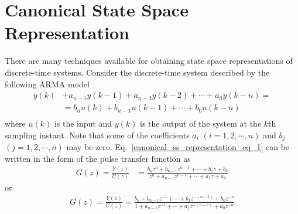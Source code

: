 \documentclass[11pt,a4paper,oneside]{book}
\numberwithin{equation}{section}
\theoremstyle{it}
\theoremstyle{definition}
\begin{document}
\section{Canonical State Space Representation}
\begin{mybox}
There are many techniques available for obtaining state space representations 
of discrete-time systems. Consider the discrete-time system described by the 
following ARMA model
\begin{equation}\label{canonical_ss_representation_eq_1}
	\begin{aligned}
		y(k) &+ a_{n-1}y(k-1)+a_{n-2}y(k-2)+\cdots+a_0y(k-n) = \\[6pt]
		&= b_nu(k)+b_{n-1}u(k-1)+\cdots+b_0u(k-n) \\
	\end{aligned}
\end{equation}
where $u(k)$ is the input and $y(k)$ is the output of the system at the $k$th sampling instant. Note that some of the coefficients $a_i$ $(i=1,2,\cdots,n)$ and $b_j$ $(j=1,2,\cdots,n)$ may be zero. Eq.~\ref{canonical_ss_representation_eq_1} can be written in the form of the pulse transfer function as
\begin{equation}\label{canonical_ss_representation_eq_2}
	\begin{aligned}
		G(z)=\frac{Y(z)}{U(z)} &= \frac{b_nz^n+b_{n-1}z^{n-1}+ \cdots +b_1z+b_0}{z^n+a_{n-1}z^{n-1}+ \cdots +a_1z+a_0}
	\end{aligned}
\end{equation}
or 
\begin{equation}\label{canonical_ss_representation_eq_3}
	\begin{aligned}
		G(z)=\frac{Y(z)}{U(z)} = \frac{b_n +b_{n-1}z^{-1}+ \cdots +b_1 z^{-(n-1)} + b_0 z^{-n}}{1 + a_{n-1}z^{-1}+ \cdots +a_1 z^{-(n-1)}+a_0 z^{-n}}
	\end{aligned}
\end{equation}
\end{mybox}
\end{document}
